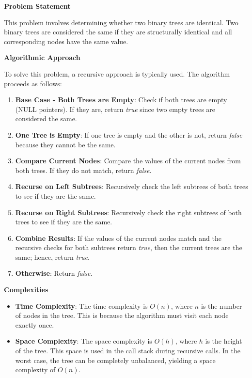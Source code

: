 

\textbf{Problem Statement}

This problem involves determining whether two binary trees are identical. Two binary trees are considered the same if they are structurally identical and all corresponding nodes have the same value.


\textbf{Algorithmic Approach}

To solve this problem, a recursive approach is typically used. The algorithm proceeds as follows:

\begin{enumerate}
    \item \textbf{Base Case - Both Trees are Empty}: Check if both trees are empty (NULL pointers). If they are, return \textit{true} since two empty trees are considered the same.
    \item \textbf{One Tree is Empty}: If one tree is empty and the other is not, return \textit{false} because they cannot be the same.
    \item \textbf{Compare Current Nodes}: Compare the values of the current nodes from both trees. If they do not match, return \textit{false}.
    \item \textbf{Recurse on Left Subtrees}: Recursively check the left subtrees of both trees to see if they are the same.
    \item \textbf{Recurse on Right Subtrees}: Recursively check the right subtrees of both trees to see if they are the same.
    \item \textbf{Combine Results}: If the values of the current nodes match and the recursive checks for both subtrees return \textit{true}, then the current trees are the same; hence, return \textit{true}.
    \item \textbf{Otherwise}: Return \textit{false}.
\end{enumerate}

\textbf{Complexities}

\begin{itemize}
    \item \textbf{Time Complexity}: The time complexity is \(O(n)\), where \(n\) is the number of nodes in the tree. This is because the algorithm must visit each node exactly once.
    \item \textbf{Space Complexity}: The space complexity is \(O(h)\), where \(h\) is the height of the tree. This space is used in the call stack during recursive calls. In the worst case, the tree can be completely unbalanced, yielding a space complexity of \(O(n)\).
\end{itemize}

